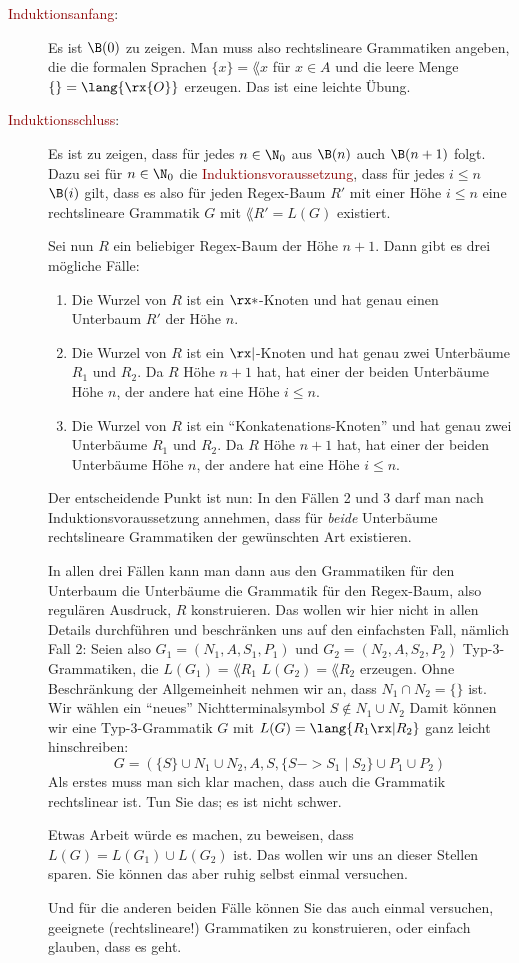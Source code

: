 \begin{description}
\item[\textcolor{darkred}{Induktionsanfang}:] Es ist $\B(0)$ zu
  zeigen. Man muss also rechtslineare Grammatiken angeben, die die
  formalen Sprachen $\{x\}=\lang{x}$ für $x\in A$ und die leere Menge
  $\{\}=\lang{\rx{O}}$ erzeugen. Das ist eine leichte Übung.
\item[\textcolor{darkred}{Induktionsschluss}:] Es ist zu zeigen, dass
  für jedes $n\in\N_0$ aus $\B(n)$ auch $\B(n+1)$ folgt. Dazu sei für
  $n\in\N_0$ die \textcolor{darkred}{Induktionsvoraussetzung}, dass
  für jedes $i\leq n$ $\B(i)$ gilt, dass es also für jeden Regex-Baum
  $R'$ mit einer Höhe $i\leq n$ eine rechtslineare Grammatik $G$ mit
  $\lang{R'}=L(G)$ existiert.

  Sei nun $R$ ein beliebiger Regex-Baum der Höhe $n+1$. Dann gibt es
  drei mögliche Fälle:
  \begin{enumerate}
  \item Die Wurzel von $R$ ist ein $\rx*$-Knoten und hat genau einen
    Unterbaum $R'$ der Höhe $n$.
  \item Die Wurzel von $R$ ist ein $\rx|$-Knoten und hat genau zwei
    Unterbäume $R_1$ und $R_2$. Da $R$ Höhe $n+1$ hat, hat einer der
    beiden Unterbäume Höhe $n$, der andere hat eine Höhe $i\leq n$.
  \item Die Wurzel von $R$ ist ein "`Konkatenations-Knoten"' und hat
    genau zwei Unterbäume $R_1$ und $R_2$. Da $R$ Höhe $n+1$ hat, hat
    einer der beiden Unterbäume Höhe $n$, der andere hat eine Höhe
    $i\leq n$.
  \end{enumerate}
  Der entscheidende Punkt ist nun: In den Fällen 2 und 3 darf man nach
  Induktionsvoraussetzung annehmen, dass für \emph{beide} Unterbäume
  rechtslineare Grammatiken der gewünschten Art existieren.

  In allen drei Fällen kann man dann aus den Grammatiken für den
  Unterbaum \bzw die Unterbäume die Grammatik für den Regex-Baum, also
  regulären Ausdruck, $R$ konstruieren. Das wollen wir hier nicht
  in allen Details durchführen und beschränken uns auf den einfachsten
  Fall, nämlich Fall 2: Seien also $G_1=(N_1,A,S_1,P_1)$ und
  $G_2=(N_2,A,S_2,P_2)$ Typ-3-Grammatiken, die $L(G_1)=\lang{R_1}$
  \bzw $L(G_2)=\lang{R_2}$ erzeugen. Ohne Beschränkung der
  Allgemeinheit nehmen wir an, dass $N_1\cap N_2=\{\}$ ist. Wir
  wählen ein "`neues"' Nichtterminalsymbol $S\notin N_1\cup N_2$ Damit
  können wir eine Typ-3-Grammatik $G$ mit $L(G)=\lang{R_1\rx| R_2}$
  ganz leicht hinschreiben:
  \[
  G = (\{S\}\cup N_1\cup N_2, A, S, \{ S-> S_1\mid S_2\} \cup P_1\cup P_2)
  \]
  Als erstes muss man sich klar machen, dass auch die Grammatik
  rechtslinear ist. Tun Sie das; es ist nicht schwer. 

  Etwas Arbeit würde es machen, zu beweisen, dass $L(G)=L(G_1)\cup
  L(G_2)$ ist. Das wollen wir uns an dieser Stellen sparen.
  Sie können das aber ruhig selbst einmal versuchen. 

  Und für die anderen beiden Fälle können Sie das auch einmal
  versuchen, geeignete (rechtslineare!) Grammatiken zu konstruieren,
  oder einfach glauben, dass es geht.
\end{description}

